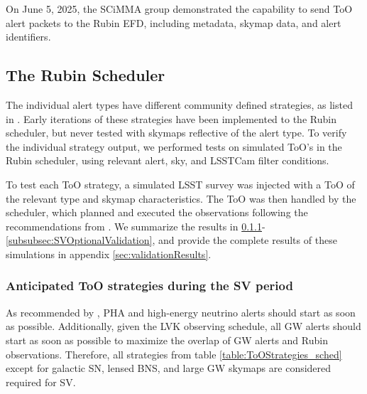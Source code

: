 On June 5, 2025, the SCiMMA group demonstrated the capability to send ToO alert packets to the Rubin EFD, including metadata, skymap data, and alert identifiers.

\subsection{The Rubin Scheduler}\label{subsec:Scheduler verification}

The individual alert types have different community defined strategies, as listed in \cite{RubinToO2024}. Early iterations of these strategies have been implemented to the Rubin scheduler, but never tested with skymaps reflective of the alert type. To verify the individual strategy output, we performed tests on simulated ToO's in the Rubin scheduler, using relevant alert, sky, and LSSTCam filter conditions.

To test each ToO strategy, a simulated LSST survey was injected with a ToO of the relevant type and skymap characteristics. The ToO was then handled by the scheduler, which planned and executed the observations following the recommendations from \cite{RubinToO2024}. We summarize the results in \ref{subsubsec:SVRequiredValidation}-\ref{subsubsec:SVOptionalValidation}, and provide the complete results of these simulations in appendix \ref{sec:validationResults}.

\subsubsection{Anticipated ToO strategies during the SV period}\label{subsubsec:SVRequiredValidation}

As recommended by \cite{PSTN-056}, PHA and high-energy neutrino alerts should start as soon as possible. Additionally, given the LVK observing schedule, all GW alerts should start as soon as possible to maximize the overlap of GW alerts and Rubin observations. Therefore, all strategies from table \ref{table:ToOStrategies_sched} except for galactic SN, lensed BNS, and large GW skymaps are considered required for SV.

